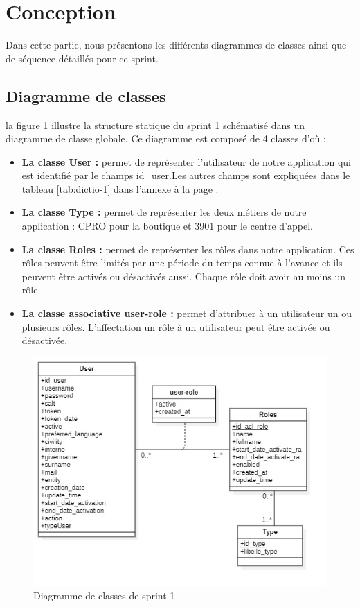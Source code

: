\section{Conception}
Dans cette partie, nous présentons les différents diagrammes de classes ainsi que de séquence détaillés pour ce sprint.
\subsection{Diagramme de classes}
la figure \ref{fig:classdiag-sprint1} illustre la structure statique du sprint 1 schématisé dans un diagramme de classe globale. Ce diagramme est composé de 4 classes d'où :
\begin{itemize}
	\item \textbf{La classe User :} permet de représenter l'utilisateur de notre application qui est identifié par le champs id\_user.Les autres champs sont expliquées dans le tableau \ref{tab:dictio-1} dans l'annexe à la page \pageref{tab:dictio-1}.
	\item \textbf{La classe Type :} permet de représenter les deux métiers de notre application : CPRO pour la boutique et 3901 pour le centre d'appel.
	\item \textbf{La classe Roles :} permet de représenter les rôles dans notre application. Ces rôles peuvent être limités par une période du temps connue à l'avance et ils peuvent être activés ou désactivés aussi. Chaque rôle doit avoir au moins un rôle.
	\item \textbf{La classe associative user-role :} permet d'attribuer à un utilisateur un ou plusieurs rôles. L'affectation un rôle à un utilisateur peut être activée ou désactivée.
\end{itemize}
\begin{figure}[H]
	\centering
	\includegraphics[width=0.7\linewidth]{img/conception/classes/ClassDiag-sprint1}
	\caption[Diagramme de classes de sprint 1]{Diagramme de classes de sprint 1}
	\label{fig:classdiag-sprint1}
\end{figure}
